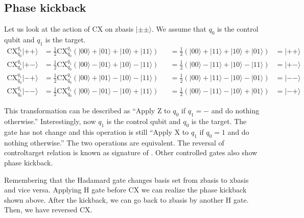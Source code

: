 \documentclass[letterpaper,10pt,english]{jupyterBook}
\begin{document}
\subsection{Phase kickback}
\label{\detokenize{q2gates/cx:phase-kickback}}\label{\detokenize{q2gates/cx:ssec-cx-kickback}}
\sphinxAtStartPar
Let us look at the action of CX on z\sphinxhyphen{}basis \(|\pm\pm\rangle\).  We assume that \(q_0\) is the control qubit and \(q_1\) is the target.
\begin{align}
\text{CX}_{q_0}^{q_1} |++\rangle &= \frac{1}{2} \text{CX}_{q_0}^{q_1} \left(|00\rangle + |01\rangle  + |10\rangle + |11\rangle \right)
&&=  \frac{1}{2} \left(|00\rangle + |11\rangle  + |10\rangle + |01\rangle \right) &= |++\rangle \\
\text{CX}_{q_0}^{q_1} |+-\rangle &= \frac{1}{2} \text{CX}_{q_0}^{q_1} \left(|00\rangle - |01\rangle  + |10\rangle - |11\rangle \right)
&&=  \frac{1}{2} \left(|00\rangle - |11\rangle  + |10\rangle - |11\rangle \right) &= |+-\rangle \\
\text{CX}_{q_0}^{q_1} |-+\rangle &= \frac{1}{2} \text{CX}_{q_0}^{q_1} \left(|00\rangle + |01\rangle  - |10\rangle - |11\rangle \right)
&&=  \frac{1}{2} \left(|00\rangle + |11\rangle  - |10\rangle - |01\rangle \right) &= |--\rangle \\
\text{CX}_{q_0}^{q_1} |--\rangle &= \frac{1}{2} \text{CX}_{q_0}^{q_1} \left(|00\rangle - |01\rangle  - |10\rangle + |11\rangle \right)
&&=  \frac{1}{2} \left(|00\rangle - |11\rangle  - |10\rangle + |01\rangle \right) &= |-+\rangle
\end{align}

\sphinxAtStartPar
This transformation can be described as “Apply Z to \(q_0\) if \(q_1=-\) and do nothing otherwise.” Interestingly, now \(q_1\) is the control qubit and \(q_0\) is the target.  The gate has not change and  this operation is still “Apply X to \(q_1\) if \(q_0=1\) and do nothing otherwise.”  The two operations are equivalent. The reversal of control\sphinxhyphen{}target relation is known as signature of .  Other controlled gates also show phase kickback.

\sphinxAtStartPar
Remembering that the Hadamard gate changes basis set from z\sphinxhyphen{}basis to x\sphinxhyphen{}basis and vice versa. Applying H gate before CX we can realize the phase kickback shown above. After the kickback, we can go back to z\sphinxhyphen{}basis by another H gate. Then, we have reversed CX.
\end{document}
